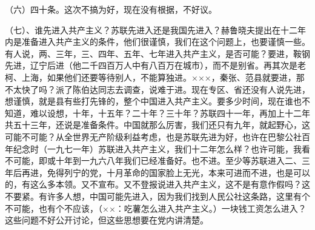 （六）四十条。这次不搞为好，现在没有根据，不好议。

（七）、谁先进入共产主义？苏联先进入还是我国先进入？赫鲁晓夫提出在十二年内是准备进入共产主义的条件，他们很谨慎，我们在这个问题上，也要谨慎一些。有人说，两、三年，三、四年、五年、七年进入共产主义，是否可能？要进，鞍钢先进，辽宁后进（他二千四百万人中有八百万在城市），而不是别省。再其次是老柯、上海，如果他们还要等待别人，不能算独进。×××，秦张、范县就要进，那不太快了吗？派了陈伯达同志去调查，说难于进。现在专区、省还没有人说先进，想谨慎，就是县有些打先锋的，整个中国进入共产主义。要多少时间，现在谁也不知道，难以设想，十年，十五年？二十年？三十年？苏联四十一年，再加上十二年共五十三年，还说是准备条件。中国就那么厉害，我们还只有九年，就起野心，这可能不可能？从全世界无产阶级利益考虑，也是苏联先进为好，也许在巴黎公社百年纪念时（一九七一年）苏联进入共产主义，我们十二年怎么样？也许可能，我看不可能，即或十年到一九六八年我们已经准备好。也不进。至少等苏联进入二、三年后再进，免得列宁的党，十月革命的国家脸上无光，本来可进而不进，也是可以的，有这么多本领。又不宣布。又不登报说进入共产主义，这不是有意作假吗？这不要紧。有许多人想，中国可能先进入，因为我们找到人民公社这条路，这里有个不可能，也有个不应该，（××：吃薯怎么进入共产主义。）一块钱工资怎么进入？这些问题不好公开讨论，但这些思想要在党内讲清楚。


